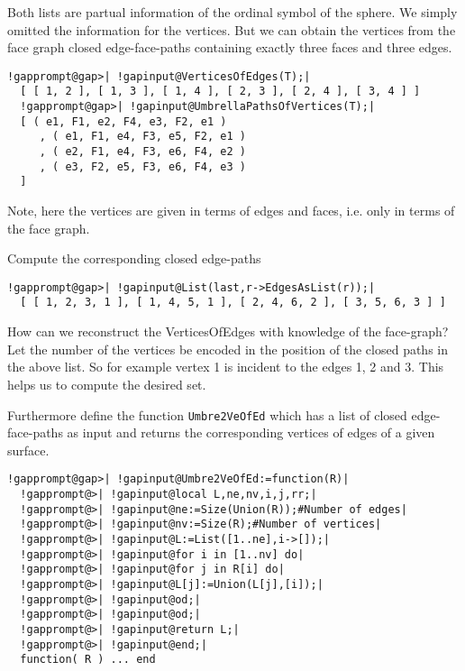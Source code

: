 \documentclass[a4paper,11pt]{report}
\begin{document}
{{{ 
\begin{center}

\end{center}
 

 Both lists are partual information of the ordinal symbol of the sphere. We
simply omitted the information for the vertices. But we can obtain the
vertices from the face graph closed edge-face-paths containing exactly three
faces and three edges. 

 
\begin{Verbatim}[commandchars=!@|,fontsize=\small,frame=single,label=Example]
  !gapprompt@gap>| !gapinput@VerticesOfEdges(T);|
  [ [ 1, 2 ], [ 1, 3 ], [ 1, 4 ], [ 2, 3 ], [ 2, 4 ], [ 3, 4 ] ]
  !gapprompt@gap>| !gapinput@UmbrellaPathsOfVertices(T);|
  [ ( e1, F1, e2, F4, e3, F2, e1 )
     , ( e1, F1, e4, F3, e5, F2, e1 )
     , ( e2, F1, e4, F3, e6, F4, e2 )
     , ( e3, F2, e5, F3, e6, F4, e3 ) 
  ]
\end{Verbatim}
 

 
\begin{center}

\end{center}
 

 Note, here the vertices are given in terms of edges and faces, i.e. only in
terms of the face graph. 

 Compute the corresponding closed edge-paths 

 
\begin{Verbatim}[commandchars=!@|,fontsize=\small,frame=single,label=Example]
  !gapprompt@gap>| !gapinput@List(last,r->EdgesAsList(r));|
  [ [ 1, 2, 3, 1 ], [ 1, 4, 5, 1 ], [ 2, 4, 6, 2 ], [ 3, 5, 6, 3 ] ]
\end{Verbatim}
 

 How can we reconstruct the VerticesOfEdges with knowledge of the face-graph?
Let the number of the vertices be encoded in the position of the closed paths
in the above list. So for example vertex 1 is incident to the edges 1, 2 and
3. This helps us to compute the desired set. 

 Furthermore define the function \texttt{Umbre2VeOfEd} which has a list of closed edge-face-paths as input and returns the
corresponding vertices of edges of a given surface. 

 
\begin{Verbatim}[commandchars=!@|,fontsize=\small,frame=single,label=Example]
  !gapprompt@gap>| !gapinput@Umbre2VeOfEd:=function(R)|
  !gapprompt@>| !gapinput@local L,ne,nv,i,j,rr;|
  !gapprompt@>| !gapinput@ne:=Size(Union(R));#Number of edges|
  !gapprompt@>| !gapinput@nv:=Size(R);#Number of vertices|
  !gapprompt@>| !gapinput@L:=List([1..ne],i->[]);|
  !gapprompt@>| !gapinput@for i in [1..nv] do|
  !gapprompt@>| !gapinput@for j in R[i] do|
  !gapprompt@>| !gapinput@L[j]:=Union(L[j],[i]);|
  !gapprompt@>| !gapinput@od;|
  !gapprompt@>| !gapinput@od;|
  !gapprompt@>| !gapinput@return L;|
  !gapprompt@>| !gapinput@end;|
  function( R ) ... end
\end{Verbatim}
 

}}}
\end{document}
